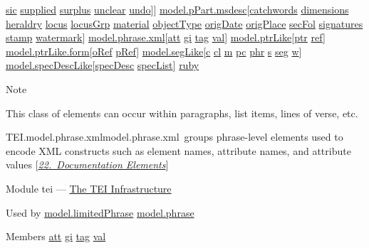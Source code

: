 \begin{reflist}
\hyperref[TEI.sic]{sic} \hyperref[TEI.supplied]{supplied} \hyperref[TEI.surplus]{surplus} \hyperref[TEI.unclear]{unclear} \hyperref[TEI.undo]{undo}]] \hyperref[TEI.model.pPart.msdesc]{model.pPart.msdesc}[\hyperref[TEI.catchwords]{catchwords} \hyperref[TEI.dimensions]{dimensions} \hyperref[TEI.heraldry]{heraldry} \hyperref[TEI.locus]{locus} \hyperref[TEI.locusGrp]{locusGrp} \hyperref[TEI.material]{material} \hyperref[TEI.objectType]{objectType} \hyperref[TEI.origDate]{origDate} \hyperref[TEI.origPlace]{origPlace} \hyperref[TEI.secFol]{secFol} \hyperref[TEI.signatures]{signatures} \hyperref[TEI.stamp]{stamp} \hyperref[TEI.watermark]{watermark}] \hyperref[TEI.model.phrase.xml]{model.phrase.xml}[\hyperref[TEI.att]{att} \hyperref[TEI.gi]{gi} \hyperref[TEI.tag]{tag} \hyperref[TEI.val]{val}] \hyperref[TEI.model.ptrLike]{model.ptrLike}[\hyperref[TEI.ptr]{ptr} \hyperref[TEI.ref]{ref}] \hyperref[TEI.model.ptrLike.form]{model.ptrLike.form}[\hyperref[TEI.oRef]{oRef} \hyperref[TEI.pRef]{pRef}] \hyperref[TEI.model.segLike]{model.segLike}[\hyperref[TEI.c]{c} \hyperref[TEI.cl]{cl} \hyperref[TEI.m]{m} \hyperref[TEI.pc]{pc} \hyperref[TEI.phr]{phr} \hyperref[TEI.s]{s} \hyperref[TEI.seg]{seg} \hyperref[TEI.w]{w}] \hyperref[TEI.model.specDescLike]{model.specDescLike}[\hyperref[TEI.specDesc]{specDesc} \hyperref[TEI.specList]{specList}] \hyperref[TEI.ruby]{ruby}
    \item[{Note}]
  \par
This class of elements can occur within paragraphs, list items, lines of verse, etc.
\end{reflist}  
\begin{reflist}
\item[]\begin{specHead}{TEI.model.phrase.xml}{model.phrase.xml} groups phrase-level elements used to encode XML constructs such as element names, attribute names, and attribute values [\textit{\hyperref[TD]{22.\ Documentation Elements}}]\end{specHead} 
    \item[{Module}]
  tei — \hyperref[ST]{The TEI Infrastructure}
    \item[{Used by}]
  \hyperref[TEI.model.limitedPhrase]{model.limitedPhrase} \hyperref[TEI.model.phrase]{model.phrase}
    \item[{Members}]
  \hyperref[TEI.att]{att} \hyperref[TEI.gi]{gi} \hyperref[TEI.tag]{tag} \hyperref[TEI.val]{val}
\end{reflist}  
